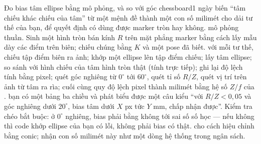 \documentclass[../../marker.tex]{subfiles}
\begin{document}
\begin{ungdung}
\end{ungdung}

\begin{duan}{Đo bias tâm ellipse bằng mô phỏng, và so với góc chessboard}{1 ngày}
\dmt biến ``tâm chiếu khác chiếu của tâm'' từ một mệnh đề thành một con số milimét cho dải tư thế của bạn, để quyết định có dùng được marker tròn hay không.
\ddl mô phỏng thuần. Sinh một hình tròn bán kính \(R\) trên mặt phẳng marker bằng cách lấy mẫu dày các điểm trên biên; chiếu chúng bằng \(K\) và một pose đã biết.
\dbc với mỗi tư thế, chiếu tập điểm biên ra ảnh; khớp một ellipse lên tập điểm chiếu; lấy tâm ellipse; so sánh với hình chiếu của tâm hình tròn thật (tính trực tiếp); ghi lại độ lệch tính bằng pixel; quét góc nghiêng từ \(0^\circ\) tới \(60^\circ\), quét tỉ số \(R/Z\), quét vị trí trên ảnh từ tâm ra rìa; cuối cùng quy độ lệch pixel thành milimét bằng hệ số \(Z/f\) của .
\dxk bạn có một bảng ba chiều và phát biểu được một câu kiểu ``với \(R/Z < 0{,}05\) và góc nghiêng dưới \(20^\circ\), bias tâm dưới \(X\) px tức \(Y\) mm, chấp nhận được''. Kiểm tra chéo bắt buộc: ở \(0^\circ\) nghiêng, bias phải bằng không tới sai số số học --- nếu không thì code khớp ellipse của bạn có lỗi, không phải bias có thật.
\dnv {} cho cách hiệu chỉnh bằng conic;  nhận con số milimét này như một dòng hệ thống trong ngân sách.
\end{duan}
\end{document}
